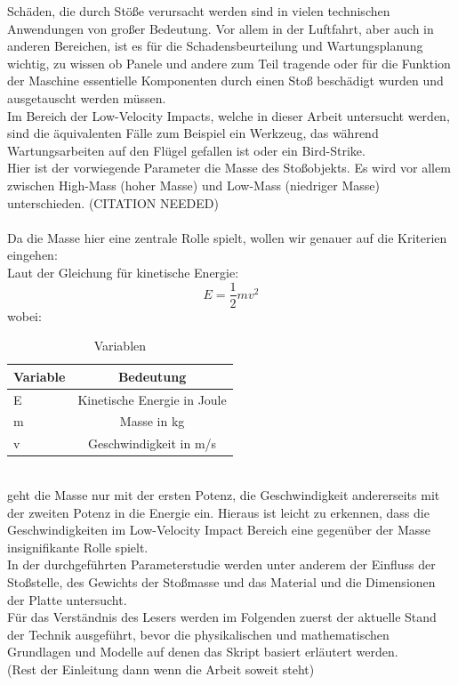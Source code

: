 Schäden, die durch Stöße verursacht werden sind in vielen technischen
Anwendungen von großer Bedeutung. Vor allem in der Luftfahrt, aber auch in
anderen Bereichen, ist es für die Schadensbeurteilung und Wartungsplanung
wichtig, zu wissen ob Panele und andere zum Teil tragende oder für die Funktion
der Maschine essentielle Komponenten durch einen Stoß beschädigt wurden und
ausgetauscht werden müssen. \\
Im Bereich der Low-Velocity Impacts, welche in dieser Arbeit untersucht werden,
sind die äquivalenten Fälle zum Beispiel ein Werkzeug, das während
Wartungsarbeiten auf den Flügel gefallen ist oder ein Bird-Strike. \\
Hier ist der vorwiegende Parameter die Masse des Stoßobjekts. Es wird vor allem
zwischen High-Mass (hoher Masse) und Low-Mass (niedriger Masse) unterschieden.
(CITATION NEEDED)\\
\\
Da die Masse hier eine zentrale Rolle spielt, wollen wir genauer auf die
Kriterien eingehen: \\
Laut der Gleichung für kinetische Energie: 
\begin{equation}
E = \frac{1}{2}mv^2
\end{equation}
wobei: 
\begin{table}[h!]
	\begin{center}
		\caption{Variablen}
		\label{tab:Tabelle 1}
		\begin{tabular}{l|c}
			\textbf{Variable} & \textbf{Bedeutung}\\
			\hline
			E & Kinetische Energie in Joule\\
			m & Masse in kg\\
			v & Geschwindigkeit in m/s\\
		\end{tabular}
	\end{center}
\end{table}\\
geht die Masse nur mit der ersten Potenz, die Geschwindigkeit andererseits mit
der zweiten Potenz in die Energie ein. Hieraus ist leicht zu erkennen, dass die
Geschwindigkeiten im Low-Velocity Impact Bereich eine gegenüber der Masse
insignifikante Rolle spielt. \\
In der durchgeführten Parameterstudie werden unter anderem der Einfluss der
Stoßstelle, des Gewichts der Stoßmasse und das Material und die Dimensionen der
Platte untersucht. \\
Für das Verständnis des Lesers werden im Folgenden zuerst der aktuelle Stand der
Technik ausgeführt, bevor die physikalischen und mathematischen Grundlagen und
Modelle auf denen das Skript basiert erläutert werden.\\
(Rest der Einleitung dann wenn die Arbeit soweit steht)
\\
